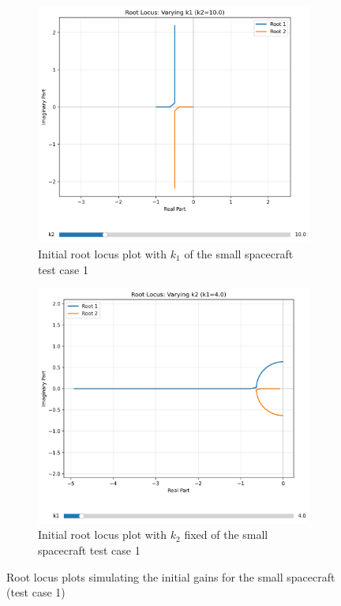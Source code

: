 \documentclass{ifacconf}
\begin{document}
\begin{figure}[H]
    \centering
    \begin{subfigure}[b]{0.48\columnwidth}
        \centering
        \includegraphics[width=\linewidth]{root_locus/base_k1_root_locus(4).pdf}
        \caption{Initial root locus plot with $k_1$ of the small spacecraft test case 1}
        \label{fig:subfig1}
    \end{subfigure}
    \hfill
    \begin{subfigure}[b]{0.48\columnwidth}
        \centering
        \includegraphics[width=\linewidth]{root_locus/base_k2_root_locus(4).pdf}
        \caption{Initial root locus plot with $k_2$ fixed of the small spacecraft test case 1}
        \label{fig:subfig2}
    \end{subfigure}
    \caption{Root locus plots simulating the initial gains for the small spacecraft (test case 1)}
    \label{fig:combined}
\end{figure}
\end{document}
